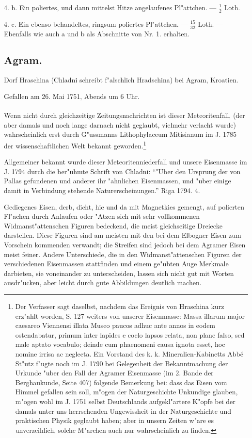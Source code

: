 \documentclass[a4paper, 11pt, oneside, polutonikogreek, german]{article}
\begin{document}
4. b. Ein poliertes, und dann mittelst Hitze angelaufenes Pl"attchen. --- $\frac{1}{2}$ Loth.

4. c. Ein ebenso behandeltes, ringsum poliertes Pl"attchen. --- $\frac{15}{32}$ Loth. --- Ebenfalls wie auch a und b als Abschnitte von Nr. 1. erhalten.
\subsection{Agram.}
\begin{center}
\small
Dorf Hraschina (Chladni schreibt f"alschlich Hradschina) bei Agram, Kroatien.

Gefallen am 26. Mai 1751, Abends um 6 Uhr.
\end{center}
\paragraph{}
Wenn nicht durch gleichzeitige Zeitungsnachrichten ist dieser Meteoritenfall, (der aber damals und noch lange darnach nicht geglaubt, vielmehr verlacht wurde) wahrscheinlich erst durch G"ussmanns Lithophylaceum Mitisianum im J. 1785 der wissenschaftlichen Welt bekannt geworden.\footnote{Der Verfasser sagt daselbst, nachdem das Ereignis von Hraschina kurz erz"ahlt worden, S. 127 weiters von unserer Eisenmasse: Massa illarum major caesareo Viennensi illata Museo paucos adhuc ante annos in eodem ostendabatur, primum inter lapides e coelo lapsos relata, non plane falso, sed male aptato vocabulo; deinde cum phaenomeni causa ignota esset, hoc nomine irrisa ac neglecta. Ein Vorstand des k. k. Mineralien-Kabinetts Abbé St"utz f"ugte noch im J. 1790 bei Gelegenheit der Bekanntmachung der Urkunde "uber den Fall der Agramer Eisenmasse (im 2. Bande der Berghaukunde, Seite 407) folgende Bemerkung bei: dass das Eisen vom Himmel gefallen sein soll, m"ogen der Naturgeschichte Unkundige glauben, m"ogen wohl im J. 1751 selbst Deutschlands aufgekl"artere K"opfe bei der damals unter uns herrschenden Ungewissheit in der Naturgeschichte und praktischen Physik geglaubt haben; aber in unsern Zeiten w"are es unverzeihlich, solche M"archen auch nur wahrscheinlich zu finden.}

Allgemeiner bekannt wurde dieser Meteoritenniederfall und unsere Eisenmasse im J. 1794 durch die ber"uhmte Schrift von Chladni: "`"Uber den Ursprung der von Pallas gefundenen und anderer ihr "ahnlichen Eisenmassen, und "uber einige damit in Verbindung stehende Naturerscheinungen."' Riga 1794. 4.

Gediegenes Eisen, derb, dicht, hie und da mit Magnetkies gemengt, auf polierten Fl"achen durch Anlaufen oder "Atzen sich mit sehr vollkommenen Widmanst"attenschen Figuren bedeckend, die meist gleichseitige Dreiecke darstellen. Diese Figuren sind am meisten mit den bei dem Elbogner Eisen zum Vorschein kommenden verwandt; die Streifen sind jedoch bei dem Agramer Eisen meist feiner. Andere Unterschiede, die in den Widmanst"attenschen Figuren der verschiedenen Eisenmassen stattfinden und einem ge"ubten Auge Merkmale darbieten, sie voneinander zu unterscheiden, lassen sich nicht gut mit Worten ausdr"ucken, aber leicht durch gute Abbildungen deutlich machen.
\end{document}
